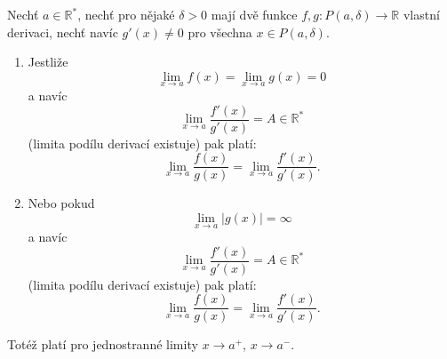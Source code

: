 \begin{theorem}
	Nechť $a \in \mathbb{R}^*$,
	nechť pro nějaké $\delta > 0$ mají dvě funkce $f, g \colon P(a, \delta) \rightarrow \mathbb{R}$ vlastní derivaci,
	nechť navíc $g'(x) \neq 0$ pro všechna $x \in P(a, \delta)$.
	\label{thm:lhospital}

	\begin{enumerate}

		\item  \emph{}
			Jestliže
			$$\lim_{x \rightarrow a}f(x) = \lim_{x \rightarrow a}g(x) = 0$$
			a navíc
			$$\lim_{x \rightarrow a} \frac{f'(x)}{g'(x)} = A \in \mathbb{R}^*$$
			(limita podílu derivací existuje) pak platí:
			$$\lim_{x \rightarrow a} \frac{f(x)}{g(x)} = \lim_{x \rightarrow a} \frac{f'(x)}{g'(x)}.$$

		\item  \emph{}
			Nebo pokud
			$$\lim_{x \rightarrow a}|g(x)| = \infty$$
			a navíc
			$$\lim_{x \rightarrow a} \frac{f'(x)}{g'(x)} = A \in \mathbb{R}^*$$
			(limita podílu derivací existuje) pak platí:
			$$\lim_{x \rightarrow a} \frac{f(x)}{g(x)} = \lim_{x \rightarrow a} \frac{f'(x)}{g'(x)}.$$

	\end{enumerate}

	Totéž platí pro jednostranné limity $x \rightarrow a^+$, $x \rightarrow a^-$.
\end{theorem}
